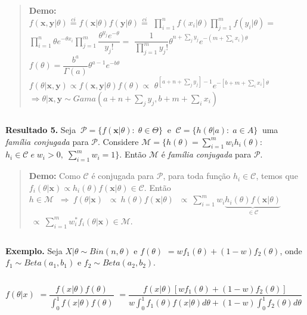 \documentclass[
]{book}
\begin{document}
\begin{quote}
\textbf{Demo:}\\
\(f(\boldsymbol x, \boldsymbol y|\theta)\overset{ci}{=}f(\boldsymbol x|\theta)f(\boldsymbol y|\theta)\overset{ci}{=}\) \(\prod_{i=1}^nf(x_i|\theta)\prod_{j=1}^mf(y_i|\theta)=\) \(\prod_{i=1}^n\theta e^{-\theta x_i}\prod_{j=1}^m\dfrac{\theta^{y_j}e^{-\theta}}{y_j!}=\) \(\dfrac{1}{\prod_{j=1}^my_j!}\theta^{n+\sum_j y_j}e^{-(m+\sum_ix_i)\theta}\)\\
\(~\)\\
\(f(\theta)=\dfrac{b^a}{\Gamma(a)}\theta^{a-1}e^{-b\theta}\)
\(~\)\\
\(f(\theta| \boldsymbol{x,y})\propto f(\boldsymbol x, \boldsymbol y|\theta)f(\theta)\propto\) \(\theta^{[a+n+\sum_jy_j]-1}e^{-[b+m+\sum_ix_i]\theta}\)
\(~\)\\
\(\Rightarrow \theta| \boldsymbol x,\boldsymbol y \sim Gama(a+n+\sum_jy_j,b+m+\sum_ix_i)\)
\end{quote}

\(~\)

\textbf{Resultado 5.} Seja \(~\mathcal{P}=\{f(\boldsymbol x|\theta):\; \theta \in \Theta\}~\) e \(~\mathcal{C}=\{h(\theta|a):\;a\in A\}~\) uma \emph{família conjugada} para \(\mathcal{P}\). Considere \(\mathcal{M}=\{h(\theta)=\sum_{i=1}^mw_ih_i(\theta):\) \(h_i \in \mathcal{C} \; e \; w_i>0,\; \sum_{i=1}^m w_i=1\}\). Então \(\mathcal{M}\) é \emph{família conjugada} para \(\mathcal{P}\).

\begin{quote}
\textbf{Demo:} Como \(\mathcal{C}\) é conjugada para \(\mathcal{P}\), para toda função \(h_i \in \mathcal{C}\), temos que \(f_i(\theta|\boldsymbol x)\propto h_i(\theta)f(\boldsymbol x|\theta)\in \mathcal{C}\). Então\\
\(~\)\\
\(h\in \mathcal{M}\) \(~\Rightarrow~ f(\theta|\boldsymbol x)\) \(~\propto~ h(\theta)f(\boldsymbol x|\theta)\) \(~\propto~\sum_{i=1}^m w_i\underbrace{h_i(\theta)f(\boldsymbol x|\theta)}_{\in \mathcal{C}}\) \(~\propto~\sum_{i=1}^m w_i^*f_i(\theta|\boldsymbol x)\in \mathcal{M}\).
\end{quote}

\(~\)

\textbf{Exemplo.} Seja \(X|\theta \sim Bin(n,\theta)\) e \(f(\theta)\) \(=wf_1(\theta)+(1-w)f_2(\theta)\), onde \(f_1\sim Beta(a_1,b_1)\) e \(f_2\sim Beta(a_2,b_2)\).

\(~\)

\(f(\theta|x)\) \(=\dfrac{f(x|\theta)f(\theta)}{\int_0^1f(x|\theta)f(\theta)}\) \(=\dfrac{f(x|\theta)[wf_1(\theta)+(1-w)f_2(\theta)]}{w\int_0^1f_1(\theta)f(x|\theta)d\theta+(1-w)\int_0^1f_2(\theta)d\theta}\)
\end{document}
